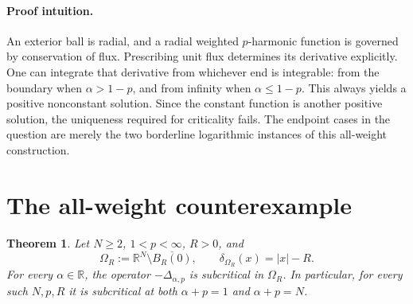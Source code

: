 \documentclass[11pt]{article}
\newtheorem{theorem}{Theorem}
\newcommand{\R}{\mathbb R}
\newcommand{\Om}{\Omega_R}
\begin{document}
\paragraph{Proof intuition.}
An exterior ball is radial, and a radial weighted $p$-harmonic function is
governed by conservation of flux.  Prescribing unit flux determines its
derivative explicitly.  One can integrate that derivative from whichever end
is integrable: from the boundary when $\alpha>1-p$, and from infinity when
$\alpha\le1-p$.  This always yields a positive nonconstant solution.  Since
the constant function is another positive solution, the uniqueness required
for criticality fails.  The endpoint cases in the question are merely the two
borderline logarithmic instances of this all-weight construction.

\section{The all-weight counterexample}

\begin{theorem}\label{thm:main}
Let $N\ge2$, $1<p<\infty$, $R>0$, and
\[
 \Om:=\R^N\setminus\overline{B_R(0)},
 \qquad \delta_{\Om}(x)=|x|-R.
\]
For every $\alpha\in\R$, the operator $-\Delta_{\alpha,p}$ is subcritical in
$\Om$.  In particular, for every such $N,p,R$ it is subcritical at both
$\alpha+p=1$ and $\alpha+p=N$.
\end{theorem}
\end{document}
